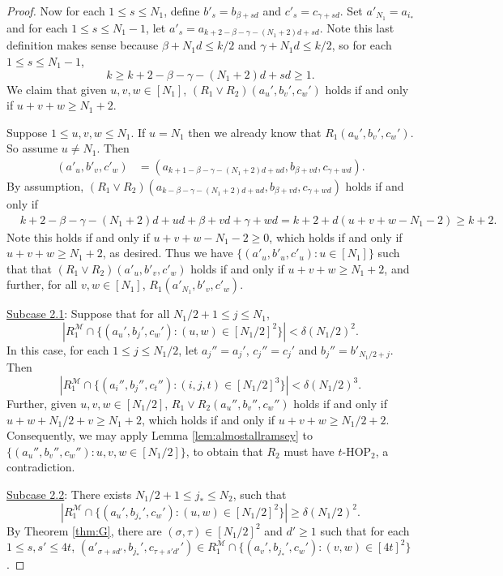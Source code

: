 \documentclass[12pt,oneside,british,a4wide]{amsart}
\numberwithin{equation}{section}
\theoremstyle{definition}
\def\HOP{\mathrm{HOP}}
\newcommand{\calM}{\mathcal{M}}
\begin{document}
\begin{proof}
Now for each $1\leq s\leq N_1$, define $b'_s=b_{\beta+sd}$ and $c'_s=c_{\gamma+sd}$.  Set $a'_{N_1}=a_{i_*}$ and for each $1\leq s\leq N_1-1$, let $a'_s= a_{k+2-\beta-\gamma -(N_1+2)d+sd}$.  Note this last definition makes sense because $\beta+N_1d\leq k/2$ and $\gamma+N_1d\leq k/2$, so for each $1\leq s\leq N_1-1$, 
$$
k\geq k+2-\beta-\gamma-(N_1+2)d+sd\geq 1.
$$
  We claim that given $u,v,w\in [N_1]$, $(R_1\vee R_2)(a_u',b_v',c_w')$ holds if and only if $u+v+w\geq N_1+2$.


Suppose $1\leq u,v,w\leq N_1$.  If $u=N_1$ then we already know that $R_1(a_u',b_v',c_w')$.  So assume $u\neq N_1$.  Then 
\begin{align*}
(a'_u,b'_v,c'_w)&=(a_{k+1-\beta-\gamma-(N_1+2)d+ud},b_{\beta+vd},c_{\gamma+wd}). 
\end{align*}
By assumption, $(R_1\vee R_2)(a_{k-\beta-\gamma-(N_1+2)d+ud},b_{\beta+vd},c_{\gamma+wd})$ holds if and only if 
\begin{align*}
&k+2-\beta-\gamma-(N_1+2)d+ud+\beta+vd+\gamma+wd=k+2+d(u+v+w-N_1-2)\geq k+2.
\end{align*}
Note this holds if and only if $u+v+w-N_1-2\geq 0$, which holds if and only if $u+v+w\geq N_1+2$, as desired.  Thus we have   $\{(a'_u,b'_u,c'_u): u\in [N_1]\}$ such that that $(R_1\vee R_2)(a'_u,b'_v,c'_w)$ holds if and only if $u+v+w\geq N_1+2$, and further, for all $v,w\in [N_1]$, $R_1(a'_{N_1},b'_v,c'_w)$. 

\underline{Subcase 2.1}: Suppose that for all $N_1/2+1\leq j\leq N_1$, 
$$
|R^\calM_1\cap \{(a_u',b_j',c_w'): (u,w)\in [N_1/2]^2\}|<\delta (N_1/2)^2.
$$
In this case, for each $1\leq j\leq N_1/2$, let $a_j''=a_j'$, $c_j''=c_j'$ and $b_j''=b'_{N_1/2+j}$. Then 
$$
|R^\calM_1\cap \{(a_i'',b_j'',c_t''): (i,j,t)\in [N_1/2]^3\}|<\delta (N_1/2)^3.
$$
Further, given $u,v,w\in [N_1/2]$, $R_1\vee R_2(a_u'',b_v'',c_w'')$ holds if and only if $u+w+N_1/2+v\geq N_1+2$, which holds if and only if $u+v+w\geq N_1/2+2$.  Consequently, we may apply Lemma \ref{lem:almostallramsey} to $\{(a_u'',b_v'',c_w''): u,v,w\in [N_1/2]\}$, to obtain that $R_2$ must have $t$-$\HOP_2$, a contradiction.

\underline{Subcase 2.2}: There exists $N_1/2+1\leq j_*\leq N_2$, such that 
$$
|R^\calM_1\cap \{(a_u',b_{j_*}',c_w'): (u,w)\in [N_1/2]^2\}|\geq \delta (N_1/2)^2.
$$
By Theorem \ref{thm:G}, there are $(\sigma,\tau)\in [N_1/2]^2$ and $d'\geq 1$ such that for each $1\leq s,s'\leq 4t$, $(a'_{\sigma+sd'},b_{j_*}', c_{\tau+s'd'}')\in R^\calM_1\cap \{(a_v',b_{j_*}',c_w'): (v,w)\in [4t]^2\}$.  


\end{proof}
\end{document}
